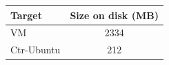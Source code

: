 \begin{tabular}{|l|c|}
\hline
\textbf{Target} & \textbf{Size on disk (MB)} \\
\hline
VM & 2334 \\
\hline
Ctr-Ubuntu & 212 \\
\hline
\end{tabular}
